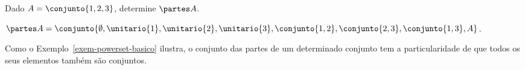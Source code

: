 \begin{example}
	\label{exem-powerset-basico}
	Dado $A = \conjunto{1, 2, 3}$, determine $\partes A$.
\end{example}

\begin{solution}
	$\partes A = \conjunto{\emptyset, \unitario{1}, \unitario{2}, \unitario{3}, \conjunto{1,2}, \conjunto{2,3}, \conjunto{1,3}, A}$.
\end{solution}

\begin{remark}
	Como o Exemplo~\ref{exem-powerset-basico} ilustra, o conjunto das partes de um determinado conjunto tem a particularidade de que todos os seus elementos também são conjuntos.
\end{remark}
